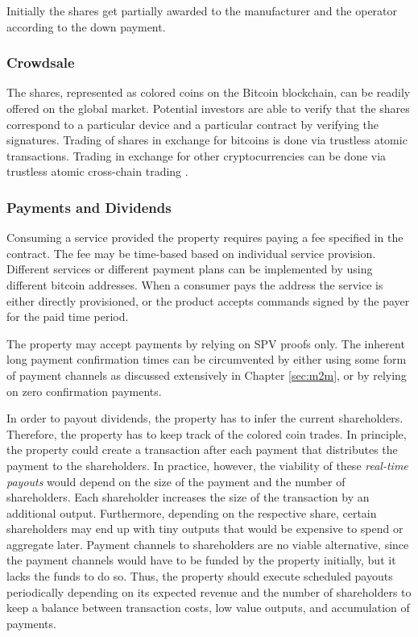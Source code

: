 Initially the shares get partially awarded to the manufacturer and the operator according to the down payment.

\subsubsection{Crowdsale}

The shares, represented as colored coins on the Bitcoin blockchain, can be readily offered on the global market. Potential investors are able to verify that the shares correspond to a particular device and a particular contract by verifying the signatures. Trading of shares in exchange for bitcoins is done via trustless atomic transactions. Trading in exchange for other cryptocurrencies can be done via trustless atomic cross-chain trading \parencite{atomiccrosschaintrading}.

\subsubsection{Payments and Dividends}

Consuming a service provided the property requires paying a fee specified in the contract. The fee may be time-based based on individual service provision. Different services or different payment plans can be implemented by using different bitcoin addresses. When a consumer pays the address the service is either directly provisioned, or the product accepts commands signed by the payer for the paid time period.

The property may accept payments by relying on SPV proofs only. The inherent long payment confirmation times can be circumvented by either using some form of payment channels as discussed extensively in Chapter \ref{sec:m2m}, or by relying on zero confirmation payments.

In order to payout dividends, the property has to infer the current shareholders. Therefore, the property has to keep track of the colored coin trades. In principle, the property could create a transaction after each payment that distributes the payment to the shareholders. In practice, however, the viability of these \emph{real-time payouts} would depend on the size of the payment and the number of shareholders. Each shareholder increases the size of the transaction by an additional output. Furthermore, depending on the respective share, certain shareholders may end up with tiny outputs that would be expensive to spend or aggregate later.
Payment channels to shareholders are no viable alternative, since the payment channels would have to be funded by the property initially, but it lacks the funds to do so. Thus, the property should execute scheduled payouts periodically depending on its expected revenue and the number of shareholders to keep a balance between transaction costs, low value outputs, and accumulation of payments.

